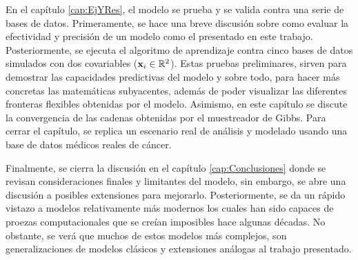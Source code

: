 \documentclass[../Main/Main.tex]{subfiles}
\begin{document}
En el capítulo \ref{cap:EjYRes}, el modelo se prueba y se valida contra una serie de bases de datos. Primeramente, se hace una breve discusión sobre como evaluar la efectividad y precisión de un modelo como el presentado en este trabajo. Posteriormente, se ejecuta el algoritmo de aprendizaje contra cinco bases de datos simulados con dos covariables ($\mathbf{x}_i \in \mathbb{R}^2$). Estas pruebas preliminares, sirven para demostrar las capacidades predictivas del modelo y sobre todo, para hacer más concretas las matemáticas subyacentes, además de poder visualizar las diferentes fronteras flexibles obtenidas por el modelo. Asimismo, en este capítulo se discute la convergencia de las cadenas obtenidas por el muestreador de Gibbs. Para cerrar el capítulo, se replica un escenario real de análisis y modelado usando una base de datos médicos reales de cáncer.

Finalmente, se cierra la discusión en el capítulo \ref{cap:Conclusiones} donde se revisan consideraciones finales y limitantes del modelo, sin embargo, se abre una discusión a posibles extensiones para mejorarlo. Posteriormente, se da un rápido vistazo a modelos relativamente más modernos los cuales han sido capaces de proezas computacionales que se creían imposibles hace algunas décadas. No obstante, se verá que muchos de estos modelos más complejos, son generalizaciones de modelos clásicos y extensiones análogas al trabajo presentado. 
\end{document}
